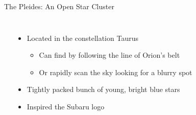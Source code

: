 \documentclass[pdf, ]{beamer}
\begin{document}
\begin{frame}{The Pleides: An Open Star Cluster}
\begin{columns}
\begin{center}
		\end{center}
		\begin{itemize}
			\item Located in the constellation Taurus
				\begin{itemize}
					\item Can find by following the line of Orion's belt
					\item Or rapidly scan the sky looking for a blurry spot
				\end{itemize}
			\item Tightly packed bunch of young, bright blue stars
			\item Inspired the Subaru logo
		\end{itemize}
	\end{columns}
\end{frame}
\end{document}
